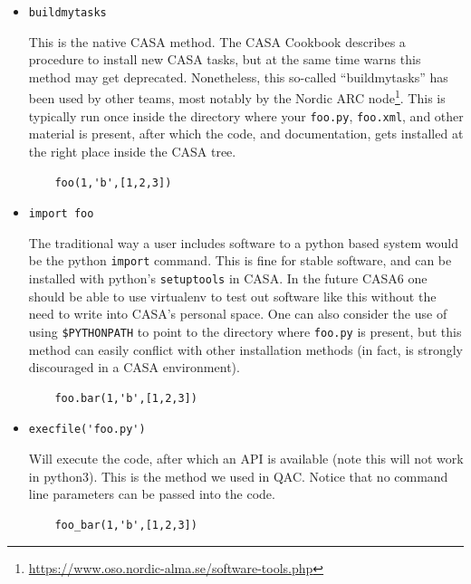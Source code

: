 \documentclass[11pt,twoside]{article}
\begin{document}
\begin{itemize}

\item[1.] \verb+buildmytasks+

This is the native CASA method. The CASA Cookbook describes a
procedure to install new CASA tasks, but at the same time warns this
method may get deprecated. Nonetheless, this so-called
``buildmytasks'' has been used by other teams, most notably by the Nordic ARC
node\footnote{\url{https://www.oso.nordic-alma.se/software-tools.php}}. This
is typically run once inside the directory where your {\tt foo.py}, {\tt foo.xml},
and other material is present, after which the code, and documentation, gets installed
at the right place inside the CASA tree.

\footnotesize
\begin{verbatim}
    foo(1,'b',[1,2,3])
\end{verbatim}
\normalsize

\item[2.] \verb+import foo+

The traditional way a user includes software to a python based system
would be the python {\tt import} command.
This is fine for stable software, and can be installed with python's
{\tt setuptools} in CASA. In the future CASA6 one should be able to use
virtualenv to test out software like this without the need to write
into CASA's personal space. One can also consider the use of using \verb+$PYTHONPATH+
to point to the directory where {\tt foo.py} is present, but this method can
easily conflict with other installation methods (in fact, is strongly discouraged
in a CASA environment).


\footnotesize
\begin{verbatim}
    foo.bar(1,'b',[1,2,3])
\end{verbatim}
\normalsize



\item[3.] \verb+execfile('foo.py')+

Will execute the code,  after which an API is available  (note this will not work in python3).
This is the method we used in QAC. Notice that no command line parameters can be passed into
the code.


\footnotesize
\begin{verbatim}
    foo_bar(1,'b',[1,2,3])
\end{verbatim}
\normalsize



\end{itemize}
\end{document}
